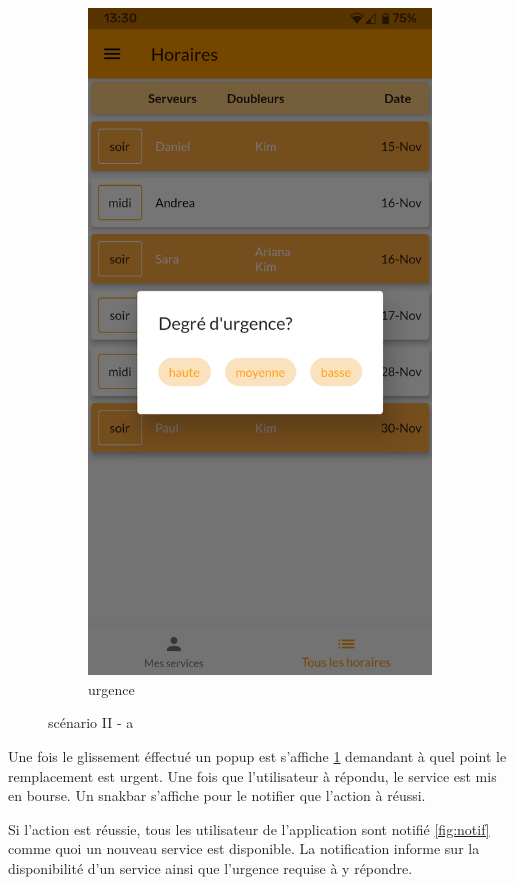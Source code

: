 \begin{figure}[!h]
\begin{subfigure}{.45\textwidth}
            \includegraphics[width=0.6\linewidth]{screenshots/scenario_02/urgence.png}
            \caption{urgence}
            \label{fig:urgence}
        \end{subfigure}
        \caption{scénario II - a}
        \label{fig:scen02a}
    \end{figure}

Une fois le glissement éffectué un popup est s'affiche \ref{fig:urgence} demandant
à quel point le remplacement est urgent. Une fois que l'utilisateur à répondu, le service est mis
en bourse. Un snakbar s'affiche pour le notifier que l'action à réussi.

Si l'action est réussie, tous les utilisateur de l'application sont notifié \ref{fig:notif} comme quoi un 
nouveau service est disponible. La notification informe sur la disponibilité d'un service ainsi que 
l'urgence requise à y répondre. 

